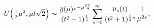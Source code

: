 \[\mathop{U\/}\nolimits\!\left(\tfrac{1}{2}\mu^{2},\mu t\sqrt{2}\right)\sim\frac%
{\overline{g}(\mu)e^{-\mu^{2}{\overline{\xi}}}}{(t^{2}+1)^{\frac{1}{4}}}\sum_{%
s=0}^{\infty}\frac{\overline{u}_{s}(t)}{(t^{2}+1)^{\frac{3}{2}s}}\frac{1}{\mu^%
{2s}},\]